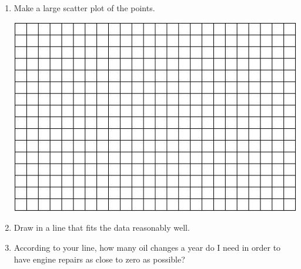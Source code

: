 \documentclass[12pt]{article}
\begin{document}
\begin{enumerate}
\begin{enumerate}
\item Make a large scatter plot of the points. 

\vspace{.1in}
\begin{center}
 {\includegraphics [width = 6in] {../GraphPaper}}
\end{center}
\vspace{.1in}

\item Draw in a line that fits the data reasonably well.
\item  According to your line, how many oil changes a year do I need in order to have engine repairs as close to zero as possible?
\end{enumerate}

\end{enumerate}
\end{document}

